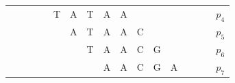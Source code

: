 \begin{center}
\begin{tabular}{cccccccccccccc}
~&\hspace{-4mm}~&\hspace{-4mm}~&\hspace{-4mm}T&\hspace{-4mm}A&\hspace{-4mm}T&\hspace{-4mm}A&\hspace{-4mm}A&\hspace{-4mm}~&\hspace{-4mm}~&\hspace{-4mm}~&\hspace{-4mm}~&\hspace{-4mm}~&$p_4$\\
~&\hspace{-4mm}~&\hspace{-4mm}~&\hspace{-4mm}~&\hspace{-4mm}A&\hspace{-4mm}T&\hspace{-4mm}A&\hspace{-4mm}A&\hspace{-4mm}C&\hspace{-4mm}~&\hspace{-4mm}~&\hspace{-4mm}~&\hspace{-4mm}~&$p_5$\\
~&\hspace{-4mm}~&\hspace{-4mm}~&\hspace{-4mm}~&\hspace{-4mm}~&\hspace{-4mm}T&\hspace{-4mm}A&\hspace{-4mm}A&\hspace{-4mm}C&\hspace{-4mm}G&\hspace{-4mm}~&\hspace{-4mm}~&\hspace{-4mm}~&$p_6$\\
~&\hspace{-4mm}~&\hspace{-4mm}~&\hspace{-4mm}~&\hspace{-4mm}~&\hspace{-4mm}~&\hspace{-4mm}A&\hspace{-4mm}A&\hspace{-4mm}C&\hspace{-4mm}G&\hspace{-4mm}A&\hspace{-4mm}~&\hspace{-4mm}~&$p_7$\\

\end{tabular}
\end{center}
